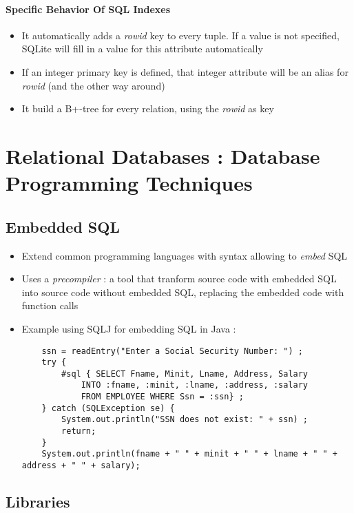 \subsubsection{Specific Behavior Of SQL Indexes}

\begin{itemize}
    \item It automatically adds a \textit{rowid} key to every tuple. If a value is not specified, SQLite will fill in a value for this attribute automatically
    \item If an integer primary key is defined, that integer attribute will be an alias for \textit{rowid} (and the other way around)
    \item It build a B+-tree for every relation, using the \textit{rowid} as key
\end{itemize}

\chapter{Relational Databases : Database Programming Techniques}

\section{Embedded SQL}

\begin{itemize}
    \item Extend common programming languages with syntax allowing to \textit{embed} SQL
    \item Uses a \textit{precompiler} : a tool that tranform source code with embedded SQL into source code without embedded SQL, replacing the embedded code with function calls
    \item Example using SQLJ for embedding SQL in Java :
    \begin{verbatim}
    ssn = readEntry("Enter a Social Security Number: ") ;
    try {
        #sql { SELECT Fname, Minit, Lname, Address, Salary
            INTO :fname, :minit, :lname, :address, :salary
            FROM EMPLOYEE WHERE Ssn = :ssn} ;
    } catch (SQLException se) {
        System.out.println("SSN does not exist: " + ssn) ;
        return;
    }
    System.out.println(fname + " " + minit + " " + lname + " " + address + " " + salary);
    \end{verbatim}
\end{itemize}

\section{Libraries}

